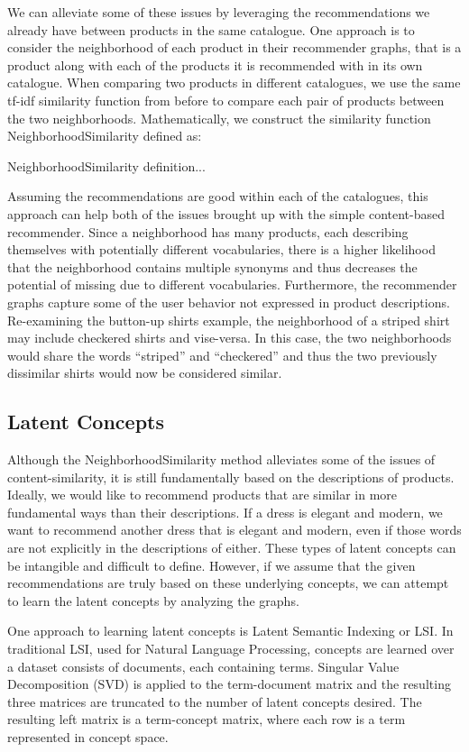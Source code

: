\documentclass[11pt]{article}
\begin{document}
We can alleviate some of these issues by leveraging the recommendations we
already have between products in the same catalogue. One approach is to consider
the neighborhood of each product in their recommender graphs, that is a product
along with each of the products it is recommended with in its own catalogue.
When comparing two products in different catalogues, we use the same tf-idf
similarity function from before to compare each pair of products between the two
neighborhoods. Mathematically, we construct the similarity function
NeighborhoodSimilarity defined as:

NeighborhoodSimilarity definition...

Assuming the recommendations are good within each of the catalogues, this
approach can help both of the issues brought up with the simple content-based
recommender. Since a neighborhood has many products, each describing themselves
with potentially different vocabularies, there is a higher likelihood that the
neighborhood contains multiple synonyms and thus decreases the potential of
missing due to different vocabularies. Furthermore, the recommender graphs
capture some of the user behavior not expressed in product descriptions.
Re-examining the button-up shirts example, the neighborhood of a striped shirt may
include checkered shirts and vise-versa. In this case, the two neighborhoods
would share the words ``striped'' and ``checkered'' and thus the two previously
dissimilar shirts would now be considered similar.

\subsection*{Latent Concepts}
Although the NeighborhoodSimilarity method alleviates some of the issues of
content-similarity, it is still fundamentally based on the descriptions of
products. Ideally, we would like to recommend products that are similar in more
fundamental ways than their descriptions. If a dress is elegant and modern, we
want to recommend another dress that is elegant and modern, even if those words
are not explicitly in the descriptions of either. These types of latent concepts
can be intangible and difficult to define. However, if we assume that the given
recommendations are truly based on these underlying concepts, we can attempt to 
learn the latent concepts by analyzing the graphs.

One approach to learning latent concepts is Latent Semantic Indexing or LSI. In
traditional LSI, used for Natural Language Processing, concepts are learned over 
a dataset consists of documents, each containing terms. Singular Value 
Decomposition (SVD) is applied to the term-document matrix and the resulting 
three matrices are truncated to the number of latent concepts desired. The 
resulting left matrix is a term-concept matrix, where each row is a term 
represented in concept space.
\end{document}

